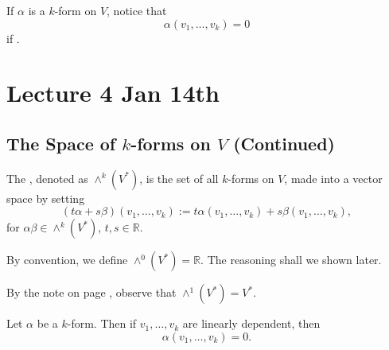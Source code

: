 \documentclass[notoc,notitlepage]{tufte-book}
\begin{document}
\begin{remark}
  If $\alpha$ is a $k$-form on $V$, notice that
  \begin{equation*}
    \alpha(v_1, \ldots, v_k) = 0
  \end{equation*}
  if .
\end{remark}



\chapter{Lecture 4 Jan 14th}%
\label{chp:lecture_4_jan_14th}

\section{The Space of \texorpdfstring{$k$}{k}-forms on \texorpdfstring{$V$}{V} (Continued)}%
\label{sec:the_space_of_k_forms_on_v_continued}

\begin{defn}\label{defn:space_of_k_forms_on_v_}
  The , denoted as $\wedge^k \left( V^* \right)$, is
  the set of all $k$-forms on $V$, made into a vector space by setting
  \begin{equation*}
    (t\alpha + s\beta)(v_1, \ldots, v_k) :=
      t\alpha(v_1, \ldots, v_k) + s\beta(v_1, \ldots, v_k),
  \end{equation*}
  for $\alpha \beta \in \wedge^k \left( V^* \right)$, $t, s \in \mathbb{R}$.
\end{defn}

\begin{note}
  By convention, we define $\wedge^0 \left( V^* \right) = \mathbb{R}$. The reasoning shall
  we shown later. %
\end{note}

\begin{note}
  By the note on page \pageref{remark:permutations}, observe that
  $\wedge^1 \left( V^* \right) = V^*$.
\end{note}

\begin{propo}\label{propo:a_k_form_is_equivalently_0_if_its_arguments_are_linearly_dependent}
  Let $\alpha$ be a $k$-form. Then if $v_1, \ldots, v_k$ are linearly dependent, then
  \begin{equation*}
    \alpha(v_1, \ldots, v_k) = 0.
  \end{equation*}
\end{propo}
\end{document}
